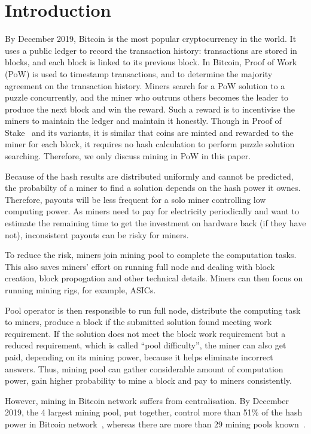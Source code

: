 \section{Introduction}
\label{sec:intro}

By December 2019, Bitcoin is the most popular cryptocurrency in the world.
It uses a public ledger to record the transaction history: transactions are stored in blocks, and each block is linked to its previous block.
In Bitcoin, Proof of Work (PoW) is used to timestamp transactions, and to determine the majority agreement on the transaction history.
Miners search for a PoW solution to a puzzle concurrently, and the miner who outruns others becomes the leader to produce the next block and win the reward.
Such a reward is to incentivise the miners to maintain the ledger and maintain it honestly.
Though in Proof of Stake~\cite{} and its variants, it is similar that coins are minted and rewarded to the miner for each block, it requires no hash calculation to perform puzzle solution searching.
Therefore, we only discuss mining in PoW in this paper.

Because of the hash results are distributed uniformly and cannot be predicted, the probabilty of a miner to find a solution depends on the hash power it ownes.
Therefore, payouts will be less frequent for a solo miner controlling low computing power.
As miners need to pay for electricity periodically and want to estimate the remaining time to get the investment on hardware back (if they have not), inconsistent payouts can be risky for miners.

To reduce the risk, miners join mining pool to complete the computation tasks.
This also saves miners' effort on running full node and dealing with block creation, block propogation and other technical details.
Miners can then focus on running mining rigs, for example, ASICs.

Pool operator is then responsible to run full node, distribute the computing task to miners, 
produce a block if the submitted solution found meeting work requirement.
If the solution does not meet the block work requirement but a reduced requirement, which is called ``pool difficulty'', the miner can also get paid, depending on its mining power, because it helps eliminate incorrect answers.
Thus, mining pool can gather considerable amount of computation power, gain higher probability to mine a block and pay to miners consistently.

However, mining in Bitcoin network suffers from centralisation.
By December 2019, the 4 largest mining pool, put together, control more than 51\% of the hash power in Bitcoin network~\cite{}, whereas there are more than 29 mining pools known~\cite{}.

